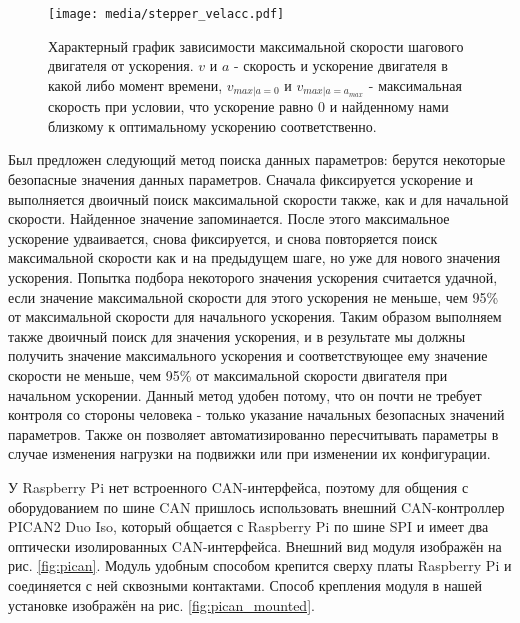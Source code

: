 \documentclass[14pt,russian,a4paper]{extarticle}
\newcounter{subsubsubsection}[subsubsection]
\begin{document}
\begin{figure}[h!]
    \centerline{\texttt{[image: media/stepper\_velacc.pdf]}}
    \caption{Характерный график зависимости максимальной скорости шагового двигателя от ускорения. $v$ и $a$ - скорость и ускорение двигателя в какой либо момент времени, $v_{max | a=0}$ и $v_{max | a=a_{max}}$ - максимальная скорость при условии, что ускорение равно 0 и найденному нами близкому к оптимальному ускорению соответственно.}
    \label{fig:stepper_velacc}
\end{figure}

Был предложен следующий метод поиска данных параметров: берутся некоторые безопасные значения данных параметров. Сначала фиксируется ускорение и выполняется двоичный поиск максимальной скорости также, как и для начальной скорости. Найденное значение запоминается. После этого максимальное ускорение удваивается, снова фиксируется, и снова повторяется поиск максимальной скорости как и на предыдущем шаге, но уже для нового значения ускорения. Попытка подбора некоторого значения ускорения считается удачной, если значение максимальной скорости для этого ускорения не меньше, чем 95\% от максимальной скорости для начального ускорения. Таким образом выполняем также двоичный поиск для значения ускорения, и в результате мы должны получить значение максимального ускорения и соответствующее ему значение скорости не меньше, чем 95\% от максимальной скорости двигателя при начальном ускорении. Данный метод удобен потому, что он почти не требует контроля со стороны человека - только указание начальных безопасных значений параметров. Также он позволяет автоматизированно пересчитывать параметры в случае изменения нагрузки на подвижки или при изменении их конфигурации.

У Raspberry Pi нет встроенного CAN-интерфейса, поэтому для общения с оборудованием по шине CAN пришлось использовать внешний CAN-контроллер PICAN2 Duo Iso, который общается с Raspberry Pi по шине SPI и имеет два оптически изолированных CAN-интерфейса. Внешний вид модуля изображён на рис. \ref{fig:pican}. Модуль удобным способом крепится сверху платы Raspberry Pi и соединяется с ней сквозными контактами. Способ крепления модуля в нашей установке изображён на рис. \ref{fig:pican_mounted}.
\end{document}
